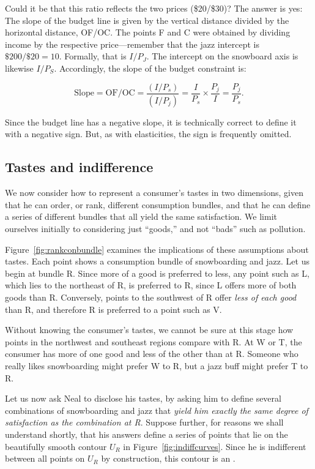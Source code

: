 Could it be that this ratio reflects the two prices (\$20/\$30)? The answer
is yes: The slope of the budget line is given by the vertical
distance divided by the horizontal distance, OF/OC. The points F and C were
obtained by dividing income by the respective price---remember that the jazz
intercept is $\$200/\$20 = 10$. Formally, that is $I/P_J$. The intercept on
the snowboard axis is likewise $I/P_S$. Accordingly, the slope of the budget 
constraint is:

\[
\text{Slope}=\text{OF/OC}=\frac{(I/P_s)}{(I/P_j)}=\frac{I}{P_s}\times\frac{P_j}{I}=\frac{P_j}{P_s}.
\]

Since the budget line has a negative slope, it is technically correct to
define it with a negative sign. But, as with elasticities, the sign is
frequently omitted.

\newhtmlpage

\subsection*{Tastes and indifference}

We now consider how to represent a consumer's tastes in two dimensions,
given that he can order, or rank, different consumption bundles, and that he
can define a series of different bundles that all yield the same
satisfaction. We limit ourselves initially to considering just ``goods,''
and not ``bads'' such as pollution.



Figure~\ref{fig:rankconbundle} examines the implications of these
assumptions about tastes. Each point shows a consumption bundle of
snowboarding and jazz. Let us begin at bundle R. Since more of a good is
preferred to less, any point such as L, which lies to the northeast of R, is
preferred to R, since L offers more of both goods than R. Conversely, points
to the southwest of R offer \textit{less of each good} than R, and therefore
R is preferred to a point such as V.

\newhtmlpage

Without knowing the consumer's tastes, we cannot be sure at this stage how
points in the northwest and southeast regions compare with R. At W or T, the
consumer has more of one good and less of the other than at R. Someone who
really likes snowboarding might prefer W to R, but a jazz buff might prefer
T to R.

Let us now ask Neal to disclose his tastes, by asking him to define several
combinations of snowboarding and jazz that \textit{yield him exactly the
	same degree of satisfaction as the combination at R}. Suppose further, for
reasons we shall understand shortly, that his answers define a series of
points that lie on the beautifully smooth contour $U_R$ in Figure~\ref{fig:indiffcurves}.
Since he is indifferent between all points on $U_R$ by
construction, this contour is an .


